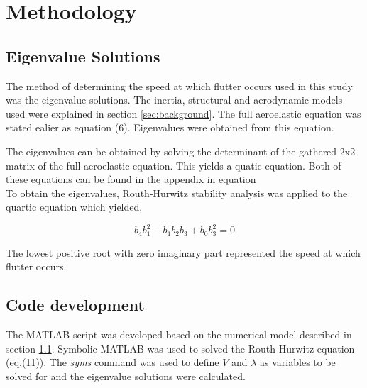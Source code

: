 \documentclass[11pt]{article}
\begin{document}
\section{Methodology}
\label{sec:method}
\subsection{Eigenvalue Solutions}
\label{sec:eig}
The method of determining the speed at which flutter occurs used in this study was the eigenvalue solutions. The inertia, structural and aerodynamic models used were explained in section \ref{sec:background}. The full aeroelastic equation was stated ealier as equation (6). Eigenvalues were obtained from this equation. 

The eigenvalues can be obtained by solving the determinant of the gathered 2x2 matrix of the full aeroelastic equation. This yields a quatic equation. Both of these equations can be found in the appendix in equation\\

To obtain the eigenvalues, Routh-Hurwitz stability analysis was applied to the quartic equation which yielded,

\begin{equation}
    b_4b_1^2-b_1b_2b_3+b_0b_3^2 = 0
\end{equation}

The lowest positive root with zero imaginary part represented the speed at which flutter occurs.

\subsection{Code development}
The MATLAB script was developed based on the numerical model described in section \ref{sec:eig}. Symbolic MATLAB was used to solved the Routh-Hurwitz equation (eq.(11)). The \textit{syms} command was used to define $V$ and $\lambda$ as variables to be solved for and the eigenvalue solutions were calculated.        
\end{document}
